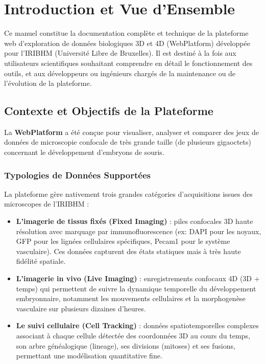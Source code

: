 \chapter{Introduction et Vue d'Ensemble}
\label{chap:introduction}

Ce manuel constitue la documentation complète et technique de la plateforme web d'exploration de données biologiques 3D et 4D (WebPlatform) développée pour l'IRIBHM (Université Libre de Bruxelles). Il est destiné à la fois aux utilisateurs scientifiques souhaitant comprendre en détail le fonctionnement des outils, et aux développeurs ou ingénieurs chargés de la maintenance ou de l'évolution de la plateforme.

\section{Contexte et Objectifs de la Plateforme}

La \textbf{WebPlatform} a été conçue pour visualiser, analyser et comparer des jeux de données de microscopie confocale de très grande taille (de plusieurs gigaoctets) concernant le développement d'embryons de souris.

\subsection{Typologies de Données Supportées}
La plateforme gère nativement trois grandes catégories d'acquisitions issues des microscopes de l'IRIBHM :
\begin{itemize}
    \item \textbf{L'imagerie de tissus fixés (Fixed Imaging)} : piles confocales 3D haute résolution avec marquage par immunofluorescence (ex: DAPI pour les noyaux, GFP pour les lignées cellulaires spécifiques, Pecam1 pour le système vasculaire). Ces données capturent des états statiques mais à très haute fidélité spatiale.
    \item \textbf{L'imagerie in vivo (Live Imaging)} : enregistrements confocaux 4D (3D + temps) qui permettent de suivre la dynamique temporelle du développement embryonnaire, notamment les mouvements cellulaires et la morphogenèse vasculaire sur plusieurs dizaines d'heures.
    \item \textbf{Le suivi cellulaire (Cell Tracking)} : données spatiotemporelles complexes associant à chaque cellule détectée des coordonnées 3D au cours du temps, son arbre généalogique (lineage), ses divisions (mitoses) et ses fusions, permettant une modélisation quantitative fine.
\end{itemize}

